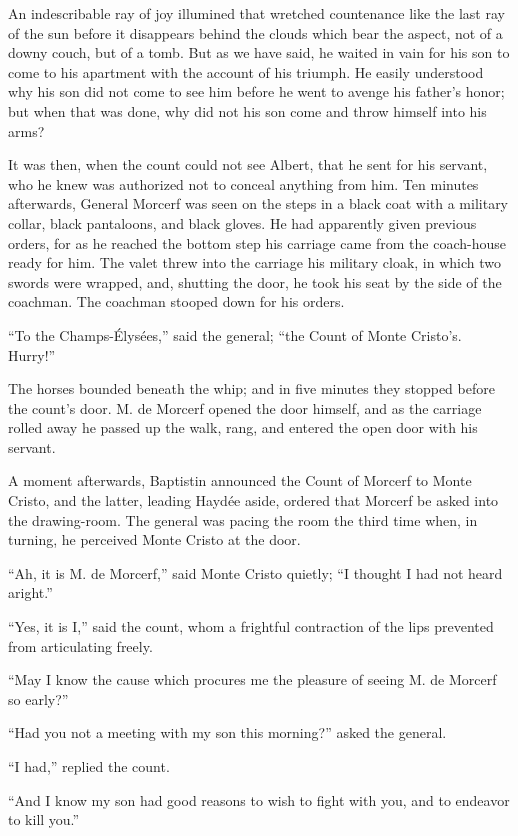 An indescribable ray of joy illumined that wretched countenance like
the last ray of the sun before it disappears behind the clouds which
bear the aspect, not of a downy couch, but of a tomb. But as we have
said, he waited in vain for his son to come to his apartment with the
account of his triumph. He easily understood why his son did not come
to see him before he went to avenge his father’s honor; but when that
was done, why did not his son come and throw himself into his arms?

It was then, when the count could not see Albert, that he sent for his
servant, who he knew was authorized not to conceal anything from him.
Ten minutes afterwards, General Morcerf was seen on the steps in a
black coat with a military collar, black pantaloons, and black gloves.
He had apparently given previous orders, for as he reached the bottom
step his carriage came from the coach-house ready for him. The valet
threw into the carriage his military cloak, in which two swords were
wrapped, and, shutting the door, he took his seat by the side of the
coachman. The coachman stooped down for his orders.

“To the Champs-Élysées,” said the general; “the Count of Monte
Cristo’s. Hurry!”

The horses bounded beneath the whip; and in five minutes they stopped
before the count’s door. M. de Morcerf opened the door himself, and as
the carriage rolled away he passed up the walk, rang, and entered the
open door with his servant.

A moment afterwards, Baptistin announced the Count of Morcerf to Monte
Cristo, and the latter, leading Haydée aside, ordered that Morcerf be
asked into the drawing-room. The general was pacing the room the third
time when, in turning, he perceived Monte Cristo at the door.

“Ah, it is M. de Morcerf,” said Monte Cristo quietly; “I thought I had
not heard aright.”

“Yes, it is I,” said the count, whom a frightful contraction of the
lips prevented from articulating freely.

“May I know the cause which procures me the pleasure of seeing M. de
Morcerf so early?”

“Had you not a meeting with my son this morning?” asked the general.

“I had,” replied the count.

“And I know my son had good reasons to wish to fight with you, and to
endeavor to kill you.”

